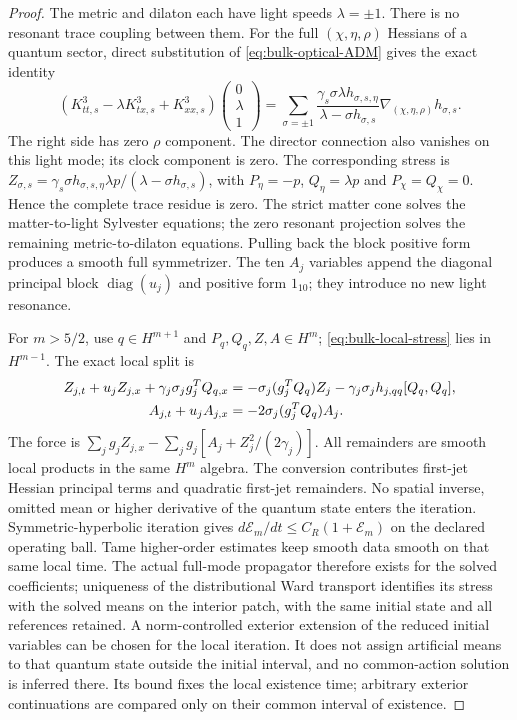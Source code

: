 \documentclass[12pt,a4paper]{article}
\begin{document}
\begin{proof}
The metric and dilaton each have light speeds $\lambda=\pm1$.
There is no resonant trace coupling between them. For the full
$(\chi,\eta,\rho)$ Hessians of a quantum sector, direct substitution
of \eqref{eq:bulk-optical-ADM} gives the exact identity
\begin{equation}
 (K^3_{tt,s}-\lambda K^3_{tx,s}+K^3_{xx,s})
       \begin{pmatrix}0\\\lambda\\1\end{pmatrix}
 =\sum_{\sigma=\pm1}
 \frac{\gamma_s\sigma\lambda h_{\sigma,s,\eta}}
      {\lambda-\sigma h_{\sigma,s}}
       \nabla_{(\chi,\eta,\rho)}h_{\sigma,s}.              \label{eq:bulk-light-residue}
\end{equation}
The right side has zero $\rho$ component. The director connection
also vanishes on this light mode; its clock component is zero.
The corresponding stress is
$Z_{\sigma,s}=\gamma_s\sigma h_{\sigma,s,\eta}\lambda p/
(\lambda-\sigma h_{\sigma,s})$, with
$P_\eta=-p$, $Q_\eta=\lambda p$ and $P_\chi=Q_\chi=0$.
Hence the complete trace residue is zero. The strict matter cone
solves the matter-to-light Sylvester equations; the zero resonant
projection solves the remaining metric-to-dilaton equations.
Pulling back the block positive form produces a smooth full symmetrizer.
The ten $A_j$ variables append the diagonal principal block
$\operatorname{diag}(u_j)$ and positive form $1_{10}$; they introduce
no new light resonance.

For $m>5/2$, use $q\in H^{m+1}$ and $P_q,Q_q,Z,A\in H^m$;
\eqref{eq:bulk-local-stress} lies in $H^{m-1}$. The exact local split is
\begin{align}
 Z_{j,t}+u_jZ_{j,x}+\gamma_j\sigma_jg_j^TQ_{q,x}
 &=-\sigma_j(g_j^TQ_q)Z_j
   -\gamma_j\sigma_jh_{j,qq}[Q_q,Q_q],\notag\\
 A_{j,t}+u_jA_{j,x}&=-2\sigma_j(g_j^TQ_q)A_j.             \label{eq:bulk-local-remainders}
\end{align}
The force is $\sum_jg_jZ_{j,x}
-\sum_jg_j[A_j+Z_j^2/(2\gamma_j)]$. All remainders are smooth
local products in the same $H^m$ algebra. The conversion contributes
first-jet Hessian principal terms and quadratic first-jet remainders.
No spatial inverse, omitted mean or higher derivative of the quantum
state enters the iteration. Symmetric-hyperbolic iteration
gives $d\mathcal E_m/dt\le C_R(1+\mathcal E_m)$ on the declared
operating ball. Tame higher-order estimates keep smooth data smooth
on that same local time. The actual full-mode propagator therefore
exists for the solved coefficients; uniqueness of the distributional
Ward transport identifies its stress with the solved means on the
interior patch, with the same initial state and all references retained.
A norm-controlled exterior extension of the reduced initial variables
can be chosen for the local iteration. It does not assign artificial
means to that quantum state outside the initial interval, and no
common-action solution is inferred there. Its bound fixes the local
existence time; arbitrary exterior continuations are compared only on
their common interval of existence.


\end{proof}
\end{document}
